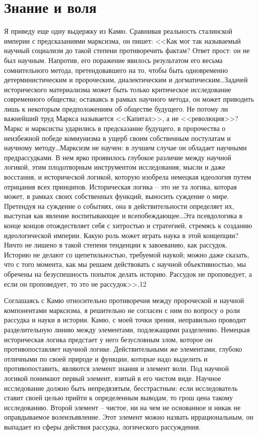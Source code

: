 \documentclass{book}
\begin{document}
\section{Знание и воля}

Я приведу еще одну выдержку из Камю. Сравнивая реальность сталинской империи с предсказаниями марксизма, он пишет:
<<Как мог так называемый научный социализм до такой степени противоречить фактам? Ответ прост: он не был научным. Напротив, его поражение явилось результатом его весьма сомнительного метода, претендовавшего на то, чтобы быть одновременно детерминистическим и пророческим, диалектическим и догматическим\ldots Задачей исторического материализма может быть только критическое исследование современного общества; оставаясь в рамках научного метода, он может приводить лишь к некоторым предположениям об обществе будущего. Не потому ли важнейший труд Маркса называется <<Капитал>>, а не <<революция>>? Маркс и марксисты ударились в предсказание будущего, в пророчества о неизбежной победе коммунизма в ущерб своим собственным постулатам и научному методу\ldots Марксизм не научен: в лучшем случае он обладает научными предрассудками. В нем ярко проявилось глубокое различие между научной логикой, этим плодотворным инструментом исследования, мысли и даже восстания, и исторической логикой, которую изобрела немецкая идеология 
путем 
отрицания всех принципов. Историческая логика -- это не та логика, которая может, в рамках своих собственных функций, выносить сужде­ние о мире. Претендуя на суждение о событиях, она в действи­тельности определяет их, выступая как явление воспитывающее и всепобеждающее\ldots Эта псевдологика в конце концов отождествляет себя с хитростью и стратегией, стремясь к созданию идеологической империи. Какую роль может играть наука в этой концепции? Ничто не лишено в такой степени тенденции к завоеванию, как рассудок. Историю не делают со щепетиль­ностью, требуемой наукой; можно даже сказать, что с того мо­мента, как мы решаем действовать с научной объективностью, мы обречены на безуспешность попыток делать историю. Рас­судок не проповедует, а если он проповедует, то это не рассу­док>>.12

Соглашаясь с Камю относительно противоречия между пророческой и научной компонентами марксизма, я решительно не согласен с ним по вопросу о роли рассудка и науки в истории. Камю, с моей точки зрения, неправильно проводит разделительную линию между элементами, подлежащими разделению. Немецкая историческая логика предстает у него безусловным злом, которое он противопоставляет научной логике. Действительными же элементами, глубоко отличными по своей природе и функции, которые надо выделить и противопоставить, являются элемент знания и элемент воли. Под научной логикой понимают первый элемент, взятый в его чистом виде. Научное исследование должно быть непредвзятым, бесстрастным: если исследователь ставит своей целью прийти к определенным выводам, то грош цена такому исследованию. Второй элемент -- чистое, ни на чем не основанное и никак не оправдываемое волеизъявление. Этот элемент можно назвать иррациональным, он выпадает из сферы действия рассудка, логического рассуждения.
\end{document}
